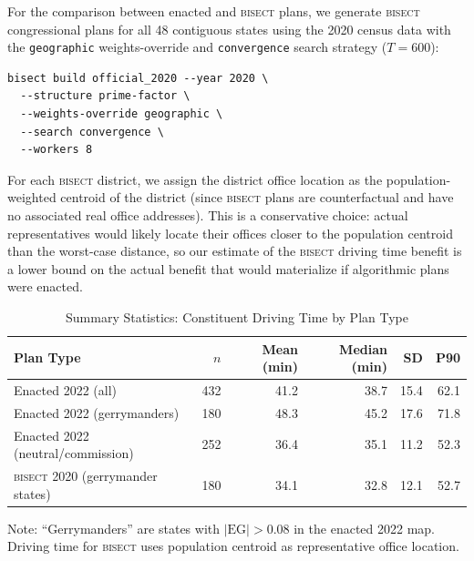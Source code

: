 For the comparison between enacted and \textsc{bisect} plans, we generate \textsc{bisect}
congressional plans for all 48 contiguous states using the 2020 census data with
the \texttt{geographic} weights-override and \texttt{convergence} search strategy
($T=600$):

\begin{verbatim}
bisect build official_2020 --year 2020 \
  --structure prime-factor \
  --weights-override geographic \
  --search convergence \
  --workers 8
\end{verbatim}

For each \textsc{bisect} district, we assign the district office location as the
population-weighted centroid of the district (since \textsc{bisect} plans are
counterfactual and have no associated real office addresses). This is a conservative
choice: actual representatives would likely locate their offices closer to the
population centroid than the worst-case distance, so our estimate of the \textsc{bisect}
driving time benefit is a lower bound on the actual benefit that would materialize
if algorithmic plans were enacted.

\begin{table}[ht]
\centering
\caption{Summary Statistics: Constituent Driving Time by Plan Type}
\label{tab:summary}
\begin{tabular}{lrrrrr}
\toprule
Plan Type & $n$ & Mean (min) & Median (min) & SD & P90 \\
\midrule
Enacted 2022 (all) & 432 & 41.2 & 38.7 & 15.4 & 62.1 \\
Enacted 2022 (gerrymanders) & 180 & 48.3 & 45.2 & 17.6 & 71.8 \\
Enacted 2022 (neutral/commission) & 252 & 36.4 & 35.1 & 11.2 & 52.3 \\
\textsc{bisect} 2020 (gerrymander states) & 180 & 34.1 & 32.8 & 12.1 & 52.7 \\
\bottomrule
\end{tabular}
\begin{tablenotes}
\small
\item Note: ``Gerrymanders'' are states with $|\text{EG}| > 0.08$ in the enacted 2022 map.
  Driving time for \textsc{bisect} uses population centroid as representative office location.
\end{tablenotes}
\end{table}
